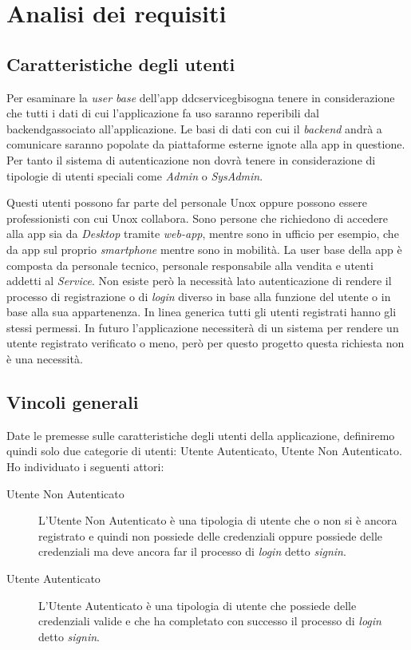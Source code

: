 \chapter{Analisi dei requisiti}
\label{chap:analisi_requisiti}

\section{Caratteristiche degli utenti}
Per esaminare la \textit{user base} dell'app \gls{ddcserviceg}\glox bisogna tenere in considerazione 
che tutti i dati di cui l'applicazione fa uso saranno reperibili dal \gls{backendg}\glox associato all'applicazione.
Le basi di dati con cui il \textit{backend} andrà a comunicare saranno popolate da piattaforme esterne ignote alla app in questione.
Per tanto il sistema di autenticazione non dovrà tenere in considerazione di tipologie di utenti speciali come \textit{Admin} o \textit{SysAdmin}.

Questi utenti possono far parte del personale Unox oppure possono essere professionisti con cui Unox collabora.
Sono persone che richiedono di accedere alla app sia da \textit{Desktop} tramite \textit{web-app}, mentre sono in ufficio per esempio, che da app sul proprio \textit{smartphone} mentre sono in mobilità.
La user base della app è composta da personale tecnico, personale responsabile alla vendita e utenti addetti al \textit{Service}.
Non esiste però la necessità lato autenticazione di rendere il processo di registrazione o di \textit{login} diverso in base alla funzione del utente o in base alla sua appartenenza.
In linea generica tutti gli utenti registrati hanno gli stessi permessi.
In futuro l'applicazione necessiterà di un sistema per rendere un utente registrato verificato o meno, però per questo progetto questa richiesta non è una necessità.

\section{Vincoli generali}
Date le premesse sulle caratteristiche degli utenti della applicazione, definiremo quindi solo due categorie di utenti: Utente Autenticato, Utente Non Autenticato.
Ho individuato i seguenti attori:
\begin{description}
	\item[Utente Non Autenticato] L'Utente Non Autenticato è una tipologia di utente che o non si è ancora registrato e quindi non possiede delle credenziali oppure possiede delle credenziali ma deve ancora far il processo di \textit{login} detto \textit{signin}.
	\item[Utente Autenticato] L'Utente Autenticato è una tipologia di utente che possiede delle credenziali valide e che ha completato con successo il processo di \textit{login} detto \textit{signin}.
\end{description}

